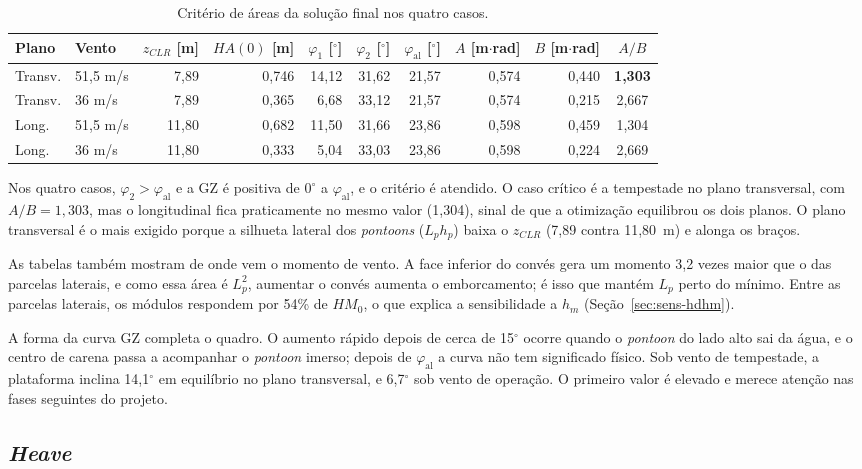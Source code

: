 \documentclass[11pt,a4paper]{article}
\newcommand{\phial}{\varphi_{\mathrm{al}}}
\begin{document}
\begin{table}[!htb]
\centering
\caption{Critério de áreas da solução final nos quatro casos.}\label{tab:criterio}
\small\setlength{\tabcolsep}{4pt}
\begin{tabular}{llrrrrrrrc}
\toprule
Plano & Vento & $z_{CLR}$ [m] & $HA(0)$ [m] & $\varphi_1$ [$^\circ$] & $\varphi_2$ [$^\circ$] &
$\phial$ [$^\circ$] & $A$ [m$\cdot$rad] & $B$ [m$\cdot$rad] & $A/B$ \\
\midrule
Transv. & 51,5 m/s & 7,89 & 0,746 & 14,12 & 31,62 & 21,57 & 0,574 & 0,440 & \textbf{1,303} \\
Transv. & 36 m/s & 7,89 & 0,365 & 6,68 & 33,12 & 21,57 & 0,574 & 0,215 & 2,667 \\
Long. & 51,5 m/s & 11,80 & 0,682 & 11,50 & 31,66 & 23,86 & 0,598 & 0,459 & 1,304 \\
Long. & 36 m/s & 11,80 & 0,333 & 5,04 & 33,03 & 23,86 & 0,598 & 0,224 & 2,669 \\
\bottomrule
\end{tabular}
\end{table}

Nos quatro casos, $\varphi_2 > \phial$ e a GZ é positiva de $0^\circ$ a $\phial$, e o critério é
atendido. O caso crítico é a tempestade no plano transversal, com $A/B = 1{,}303$, mas o
longitudinal fica praticamente no mesmo valor (1,304), sinal de que a otimização equilibrou os dois
planos. O plano transversal é o mais exigido porque a silhueta lateral dos \emph{pontoons}
($L_p h_p$) baixa o $z_{CLR}$ (7,89 contra 11,80~m) e alonga os braços.

As tabelas também mostram de onde vem o momento de vento. A face inferior do convés gera um momento
3,2 vezes maior que o das parcelas laterais, e como essa área é $L_p^2$, aumentar o convés aumenta o
emborcamento; é isso que mantém $L_p$ perto do mínimo. Entre as parcelas laterais, os módulos
respondem por 54\% de $HM_0$, o que explica a sensibilidade a $h_m$ (Seção~\ref{sec:sens-hdhm}).

A forma da curva GZ completa o quadro. O aumento rápido depois de cerca de 15$^\circ$ ocorre quando
o \emph{pontoon} do lado alto sai da água, e o centro de carena passa a acompanhar o \emph{pontoon}
imerso; depois de $\phial$ a curva não tem significado físico. Sob vento de tempestade, a plataforma
inclina 14,1$^\circ$ em equilíbrio no plano transversal, e 6,7$^\circ$ sob vento de operação. O
primeiro valor é elevado e merece atenção nas fases seguintes do projeto.

\subsection{\emph{Heave}}
\end{document}
